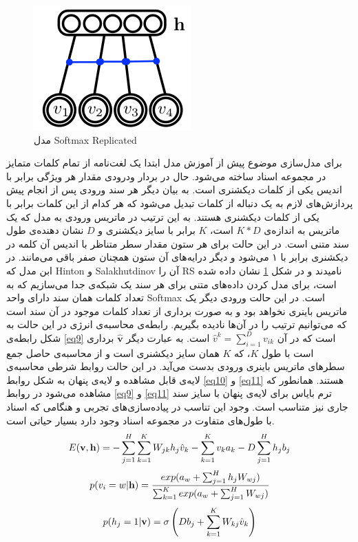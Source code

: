 \documentclass[12pt,a4paper]{article}
\begin{document}
\begin{figure}[!t]
	\centering
	\includegraphics[scale=0.4]{images/RS}
	\caption{مدل Softmax Replicated}
	\label{fig2}
\end{figure}
برای مدل‌سازی موضوع پیش از آموزش مدل ابتدا یک لغت‌نامه از تمام کلمات متمایز در مجموعه اسناد ساخته می‌‌شود. حال در بردار ودرودی مقدار هر ویژگی‌ برابر با اندیس یکی‌ از کلمات دیکشنری است. به بیان دیگر هر سند ورودی پس از انجام پیش پردازش‌های لازم به یک دنباله از کلمات تبدیل می‌شود که هر کدام از این کلمات برابر با یکی‌ از کلمات دیکشنری هستند. به این ترتیب در ماتریس ورودی به مدل که یک ماتریس به انداز‌ه‌ی
$K*D$
است،
$K$
برابر با سایز دیکشنری و
$D$
نشان دهنده‌ی طول سند متنی است. در این حالت برای هر ستون مقدار سطر متناظر با اندیس آن کلمه در دیکشنری برابر با ۱ می‌‌شود و دیگر درایه‌های آن ستون همچنان صفر باقی‌ می‌‌مانند. در ابن مدل که 
Hinton
و
Salakhutdinov
آن را
RS
نامیدند و در شکل 
\ref{fig2}
نشان داده شده است، برای مدل کردن داده‌های متنی برای هر سند یک شبکه‌ی جدا می‌‌سازیم که به تعداد کلمات همان سند دارای واحد
Softmax
است. در این حالت ورودی دیگر یک ماتریس باینری نخواهد بود و به صورت برداری از تعداد کلمات موجود در آن سند است که می‌‌توانیم ترتیب را در آن‌ها نادیده بگیریم. رابطه‌ی محاسبه‌ی انرژی در این حالت به شکل رابطه‌ی
\ref{eq9}
است که در آن
$\hat{v}^k = \sum_{i=1}^{D}v_{ik}$
است. به عبارت دیگر
$\hat{\textbf{v}}$
برداری است با طول
$K$،
که 
$K$
همان سایز دیکشنری است و از محاسبه‌ی حاصل جمع سطر‌های ماتریس باینری ورودی بدست می‌‌آید. در این حالت روابط شرطی محاسبه‌ی لایه‌ی قابل مشاهده و لایه‌ی پنهان به شکل روابط
\ref{eq10}
و
\ref{eq11}
هستند. همانطور که مشاهده می‌‌شود در روابط
\ref{eq9}
و
\ref{eq11}
ترم بایاس برای لایه‌ی پنهان با سایز سند جاری نیز متناسب است. وجود این تناسب در پیاده‌سازی‌های تجربی‌ و هنگامی که اسناد با طول‌های متفاوت در مجموعه اسناد وجود دارد بسیار حیاتی است.
\begin{align}
\centering
\label{eq9}
E(\textbf{v},\textbf{h})=-\sum_{j=1}^{H}\sum_{k=1}^{K}W_{jk}h_j\hat{v}_{k}-\sum_{k=1}^{K}v_{k}a_{k} - D\sum_{j=1}^{H}h_jb_j
\end{align}
\begin{align}
\centering
\label{eq10}
p(v_{i}=w|\textbf{h})=\dfrac{exp(a_{w}+\sum_{j=1}^{H}h_jW_{wj})}{\sum_{k=1}^{K}exp(a_{w}+\sum_{j=1}^{H}W_{wj})}
\end{align}
\begin{align}
\centering
\label{eq11}
p(h_{j}=1|\textbf{v})=\sigma \left( Db_j + \sum_{k=1}^{K}W_{kj}\hat{v}_k \right)
\end{align}
\end{document}
